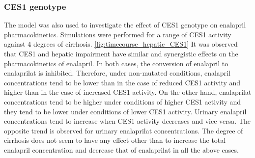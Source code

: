 \documentclass[pharmaceutics,article,submit,pdftex,moreauthors]{Definitions/mdpi}
\begin{document}

\subsubsection{CES1 genotype}
\label{sec:results_ces1_scans}

The model was also used to investigate the effect of CES1 genotype on enalapril pharmacokinetics. Simulations were performed for a range of CES1 activity against 4 degrees of cirrhosis. \ref{fig:timecourse_hepatic_CES1} It was observed that CES1 and hepatic impairment have similar and synergistic effects on the pharmacokinetics of enalapril. In both cases, the conversion of enalapril to enalaprilat is inhibited. Therefore, under non-mutated conditions, enalapril concentrations tend to be lower than in the case of reduced CES1 activity and higher than in the case of increased CES1 activity. On the other hand, enalaprilat concentrations tend to be higher under conditions of higher CES1 activity and they tend to be lower under conditions of lower CES1 activity. Urinary enalapril concentrations tend to increase when CES1 activity decreases and vice versa. The opposite trend is observed for urinary enalaprilat concentrations. The degree of cirrhosis does not seem to have any effect other than to increase the total enalapril concentration and decrease that of enalaprilat in all the above cases.

\end{document}

